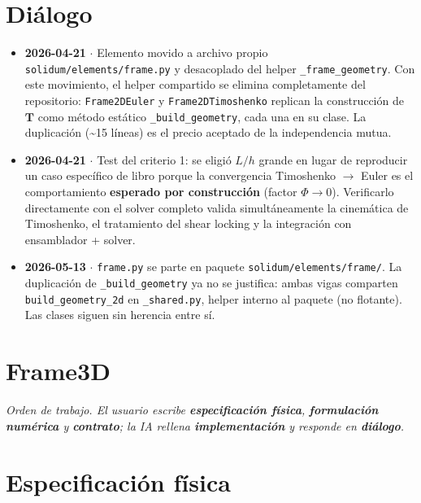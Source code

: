 \documentclass[11pt,letterpaper,oneside]{report}
\begin{document}
\section{Diálogo}

\begin{itemize}
  \item \textbf{2026-04-21} \ensuremath{\cdot} Elemento movido a archivo propio \texttt{solidum/elements/frame.py} y desacoplado del helper \texttt{\_frame\_geometry}. Con este movimiento, el helper compartido se elimina completamente del repositorio: \texttt{Frame2DEuler} y \texttt{Frame2DTimoshenko} replican la construcción de $\mathbf T$ como método estático \texttt{\_build\_geometry}, cada una en su clase. La duplicación (\textasciitilde{}15 líneas) es el precio aceptado de la independencia mutua.
  \item \textbf{2026-04-21} \ensuremath{\cdot} Test del criterio 1: se eligió $L/h$ grande en lugar de reproducir un caso específico de libro porque la convergencia Timoshenko \ensuremath{\to} Euler es el comportamiento \textbf{esperado por construcción} (factor $\Phi \to 0$). Verificarlo directamente con el solver completo valida simultáneamente la cinemática de Timoshenko, el tratamiento del shear locking y la integración con ensamblador + solver.
  \item \textbf{2026-05-13} \ensuremath{\cdot} \texttt{frame.py} se parte en paquete \texttt{solidum/elements/frame/}. La duplicación de \texttt{\_build\_geometry} ya no se justifica: ambas vigas comparten \texttt{build\_geometry\_2d} en \texttt{\_shared.py}, helper interno al paquete (no flotante). Las clases siguen sin herencia entre sí.
\end{itemize}


\newpage

\section{Frame3D}



\textit{Orden de trabajo. El usuario escribe \textbf{especificación física}, \textbf{formulación numérica} y \textbf{contrato}; la IA rellena \textbf{implementación} y responde en \textbf{diálogo}.}



\section{Especificación física}
\end{document}
